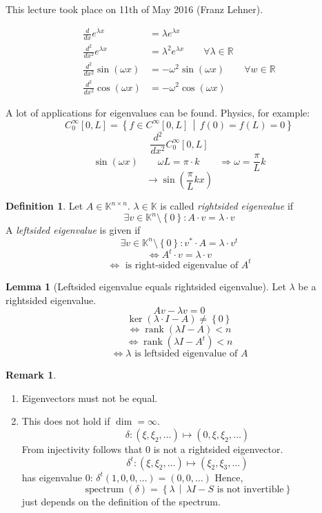 \documentclass[a4paper,landscape,twocolumn]{article}
\newcommand\meta[3]{This #1 took place on #2 (#3).\par}
\newcommand\set[1]{\left\{#1\right\}}
\newcommand\setdef[2]{\left\{#1\,\middle|\,#2\right\}}
\theoremstyle{definition}
\newtheorem{defi}{Definition}
\newtheorem{rem}{Remark}
\newtheorem{lemma}{Lemma}
\DeclareMathOperator\kernel{ker} %
\DeclareMathOperator\rank{rank} %
\DeclareMathOperator\spec{spectrum}
\begin{document}
\meta{lecture}{11th of May 2016}{Franz Lehner}

\begin{align*}
  \frac{d}{dx} e^{\lambda x} &= \lambda e^{\lambda x} \\
  \frac{d^2}{dx^2} e^{\lambda x} &= \lambda^2 e^{\lambda x} \qquad \forall \lambda \in \mathbb R \\
  \frac{d^2}{dx^2} \sin(\omega x) &= -\omega^2 \sin(\omega x) \qquad \forall w \in \mathbb R \\
  \frac{d^2}{dx^2} \cos(\omega x) &= -\omega^2 \cos(\omega x)
\end{align*}

A lot of applications for eigenvalues can be found. Physics, for example:
\[ C_0^{\infty} [0, L] = \setdef{f \in C^\infty [0, L]}{f(0) = f(L) = 0} \]
\[ \frac{d^2}{dx^2} C_0^\infty [0, L] \]
\[ \sin(\omega x) \qquad \omega L = \pi \cdot k \qquad \Rightarrow \omega = \frac{\pi}{L} k \]
\[ \rightarrow \sin\left(\frac\pi{L} kx\right) \]

\begin{defi}
  Let $A \in \mathbb K^{n\times n}$. $\lambda \in \mathbb K$ is called \emph{rightsided eigenvalue} if
  \[ \exists v \in \mathbb K^n \setminus \set{0}: A \cdot v = \lambda \cdot v \]
  A \emph{leftsided eigenvalue} is given if
  \[ \exists v \in \mathbb K^n \setminus \set{0}: v^* \cdot A = \lambda \cdot v^t \]
  \[ \Leftrightarrow A^t \cdot v = \lambda \cdot v \]
  \[ \Leftrightarrow \text{ is right-sided eigenvalue of } A^t \]
\end{defi}

\begin{lemma}[Leftsided eigenvalue equals rightsided eigenvalue]
  \label{lemma-10.5}
  Let $\lambda$ be a rightsided eigenvalue.
  \[ Av - \lambda v = 0 \]
  \[ \kernel(\lambda \cdot I - A) \neq \set{0} \]
  \[ \Leftrightarrow \rank(\lambda I - A) < n \]
  \[ \Leftrightarrow \rank(\lambda I - A^t) < n \]
  \[ \Leftrightarrow \lambda \text{ is leftsided eigenvalue of } A \]
\end{lemma}
\begin{rem}
  \label{bem-10.6}
  \begin{enumerate}
    \item Eigenvectors must not be equal.
    \item This does not hold if $\dim = \infty$.
      \[ \delta: (\xi, \xi_2, \ldots) \mapsto (0, \xi, \xi_2, \ldots) \]
      From injectivity follows that $0$ is not a rightsided eigenvector.
      \[ \delta^t: (\xi, \xi_2, \ldots) \mapsto (\xi_2, \xi_3, \ldots) \]
      has eigenvalue $0$: $\delta^t(1, 0, 0, \ldots) = (0, 0, \ldots)$
      Hence,
      \[ \spec(\delta) = \setdef{\lambda}{\lambda I - S \text{ is not invertible}} \]
      just depends on the definition of the spectrum.
  \end{enumerate}
\end{rem}
\end{document}

